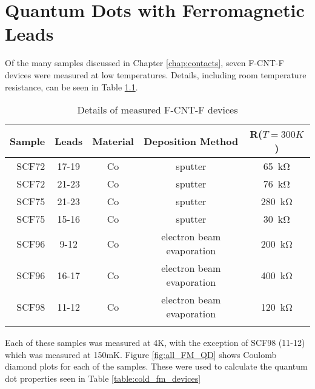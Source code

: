 \chapter{Quantum Dots with Ferromagnetic Leads}
\label{sec:FMCNTQD}

Of the many samples discussed in Chapter \ref{chap:contacts}, seven F-CNT-F devices were measured at low temperatures. Details, including room temperature resistance, can be seen in Table \ref{table:rt_fm_devices}.

\begin{table}
    \centering
    \begin{tabular}{ r | c | c c c}
        Sample & Leads & Material & Deposition Method & R($T=300K$) \\ \hline
        SCF72 & 17-19 & Co & sputter & \SI{65}{\kilo\ohm} \\
        SCF72 & 21-23 & Co & sputter & \SI{76}{\kilo\ohm}\\
        SCF75 & 21-23 & Co & sputter & \SI{280}{\kilo\ohm}\\
        SCF75 & 15-16 & Co & sputter & \SI{30}{\kilo\ohm}\\
        SCF96 & 9-12  & Co & electron beam evaporation & \SI{200}{\kilo\ohm}\\
        SCF96 & 16-17 & Co & electron beam evaporation & \SI{400}{\kilo\ohm}\\
        SCF98 & 11-12 & Co & electron beam evaporation & \SI{120}{\kilo\ohm}\\
        \label{table:rt_fm_devices}  
    \end{tabular}
    \caption{Details of measured F-CNT-F devices}
\end{table}

Each of these samples was measured at 4K, with the exception of SCF98 (11-12) which was measured at 150mK. Figure \ref{fig:all_FM_QD} shows Coulomb diamond plots for each of the samples. These were used to calculate the quantum dot properties seen in Table \ref{table:cold_fm_devices}

